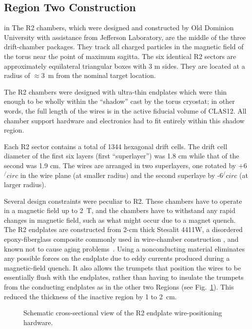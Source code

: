 
\subsection{Region Two Construction}

 in 
The R2 chambers, which were designed and constructed by Old Dominion University 
with assistance from Jefferson Laboratory, are the middle of the three  
drift-chamber packages.  They track all charged particles in the magnetic field 
of the torus near the point of maximum sagitta.  The six identical R2 sectors 
are approximately equilateral triangular boxes with 3 m sides. 
They are located at a radius of $\approx$3~m from the nominal target location.  
  
The R2 chambers were designed with ultra-thin endplates which were thin enough
to be wholly within the ``shadow'' cast by the torus cryostat; in other words,
the full length of the wires is in the active fiducial volume of CLAS12. 
All chamber support hardware and electronics had to fit 
entirely within this shadow region.

Each R2 sector contains a total of 1344 hexagonal drift cells.  The drift cell
diameter of the first six layers (first ``superlayer'') was 1.8 cm while that
of the second was 1.9 cm.   The 
wires are arranged in two superlayers, one rotated by +6$^/circ$ in the wire plane 
(at smaller radius) and the second superlaye by -6$^/circ$ (at larger radius).  


Several design constraints were peculiar to R2.  These chambers have to operate 
in a magnetic field up to 2~T, and the chambers have to withstand any rapid 
changes in magnetic field, such as what might occur due to a magnet quench.
The R2 endplates are constructed from 2-cm thick Stesalit 4411W, a disordered 
epoxy-fiberglass composite commonly used in wire-chamber construction
\cite{stesalit}, and known not to cause aging problems~\cite{stesalitaging}.  
Using a nonconducting material eliminates any possible forces on the endplate 
due to eddy currents produced during a magnetic-field quench.  It also allows 
the trumpets that position the wires to be essentially flush with the endplates, 
rather than having to insulate the trumpets from the conducting endplates as in 
the other two Regions (see Fig.~\ref{r2_inserts}).  This reduced the thickness of 
the inactive region by 1 to 2~cm.

\begin{figure}[htpb]   
\vspace{6.0cm}
\caption{\small{Schematic cross-sectional view of the R2 endplate 
wire-positioning hardware.}} 
\label{r2_inserts}
\end{figure}   




 
